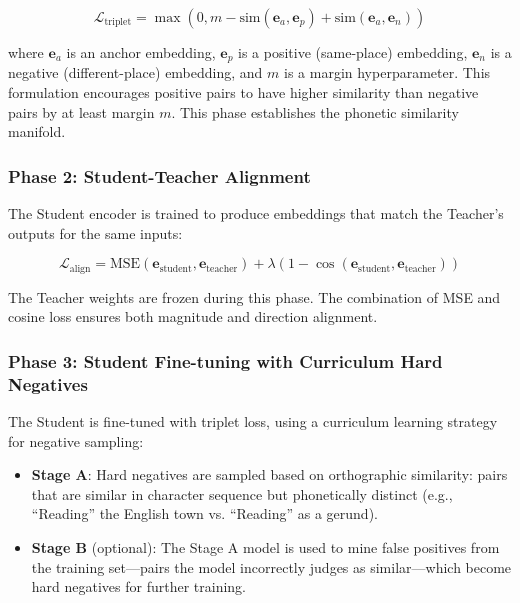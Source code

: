 \documentclass[11pt]{article}
\begin{document}
    \begin{equation}
        \mathcal{L}_{\text{triplet}} = \max(0, m - \text{sim}(\mathbf{e}_a, \mathbf{e}_p) + \text{sim}(\mathbf{e}_a, \mathbf{e}_n))
    \end{equation}

    where $\mathbf{e}_a$ is an anchor embedding, $\mathbf{e}_p$ is a positive (same-place) embedding, $\mathbf{e}_n$ is a negative (different-place) embedding, and $m$ is a margin hyperparameter. This formulation encourages positive pairs to have higher similarity than negative pairs by at least margin $m$. This phase establishes the phonetic similarity manifold.

    \subsubsection{Phase 2: Student-Teacher Alignment}

    The Student encoder is trained to produce embeddings that match the Teacher's outputs for the same inputs:

    \begin{equation}
        \mathcal{L}_{\text{align}} = \text{MSE}(\mathbf{e}_{\text{student}}, \mathbf{e}_{\text{teacher}}) + \lambda (1 - \cos(\mathbf{e}_{\text{student}}, \mathbf{e}_{\text{teacher}}))
    \end{equation}

    The Teacher weights are frozen during this phase. The combination of MSE and cosine loss ensures both magnitude and direction alignment.

    \subsubsection{Phase 3: Student Fine-tuning with Curriculum Hard Negatives}

    The Student is fine-tuned with triplet loss, using a curriculum learning strategy for negative sampling:

    \begin{itemize}
        \item \textbf{Stage A}: Hard negatives are sampled based on orthographic similarity: pairs that are similar in character sequence but phonetically distinct (e.g., ``Reading'' the English town vs. ``Reading'' as a gerund).

        \item \textbf{Stage B} (optional): The Stage A model is used to mine false positives from the training set---pairs the model incorrectly judges as similar---which become hard negatives for further training.
    \end{itemize}
\end{document}
